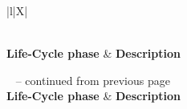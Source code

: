 \begin{xltabular}{\textwidth}{|l|X|}
	\caption[System Development Life Cycle phases]
	{\textit{System Development Life Cycle phases \cite{Khan2013, DOJ2003}}}
	\label{tbl:ch1_SDLC} \\
    
	\hline
	\textbf{Life-Cycle phase} & \textbf{Description} \\
	\hline
	\endfirsthead

	{\tablename\ \thetable{} -- continued from previous page} \\
	\hline
	\textbf{Life-Cycle phase} & \textbf{Description} \\
	\endhead

	 \\ \hline
	\endfoot

	\hline
	\endlastfoot


\end{xltabular}
